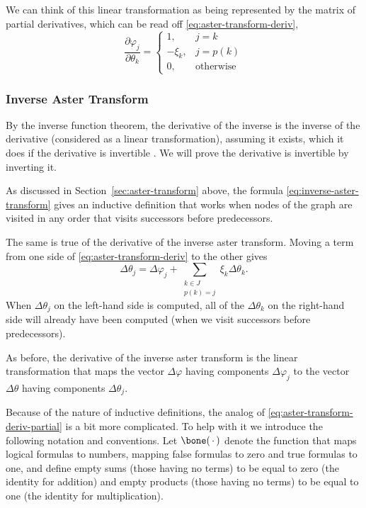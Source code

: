 We can think of this linear transformation as being represented by the matrix
of partial derivatives, which can be read off \eqref{eq:aster-transform-deriv},
\begin{equation} \label{eq:aster-transform-deriv-partial}
   \frac{\partial \varphi_j}{\partial \theta_k}
   =
   \begin{cases}
   1, & j = k \\
   - \xi_k, & j = p(k) \\
   0, & \text{otherwise}
   \end{cases}
\end{equation}

\subsubsection{Inverse Aster Transform}
\label{sec:inverse-aster-transform-deriv}

By the inverse function theorem, the derivative of the inverse is the
inverse of the derivative (considered as a linear transformation), assuming
it exists, which it does if the derivative is invertible
\cite[p.~361--363]{lang}.  We will prove the derivative is invertible by
inverting it.

As discussed in Section~\ref{sec:aster-transform} above,
the formula \eqref{eq:inverse-aster-transform}
gives an inductive definition that works when nodes of the graph are visited
in any order that visits successors before predecessors.

The same is true of the derivative of the inverse aster transform.
Moving a term from one side of \eqref{eq:aster-transform-deriv}
to the other gives
\begin{equation} \label{eq:inverse-aster-transform-deriv}
   \Delta \theta_j
   =
   \Delta \varphi_j
   +
   \sum_{\substack{k \in J \\ p(k) = j}} \xi_k \Delta \theta_k.
\end{equation}
When $\Delta \theta_j$ on the left-hand side is computed,
all of the $\Delta \theta_k$ on the
right-hand side will already have been computed (when we visit successors
before predecessors).

As before, the derivative of the inverse
aster transform is the linear transformation that maps
the vector $\Delta \varphi$ having components $\Delta \varphi_j$ to
the vector $\Delta \theta$ having components $\Delta \theta_j$.

Because of the nature of inductive definitions, the analog
of \eqref{eq:aster-transform-deriv-partial} is a bit more complicated.
To help with it we introduce the following notation and conventions.
Let $\bone(\fatdot)$ denote the function that maps logical formulas
to numbers, mapping false formulas to zero and true formulas to one,
and define empty sums (those having no terms) to be equal to zero
(the identity for addition)
and empty products (those having no terms) to be equal to one
(the identity for multiplication).


